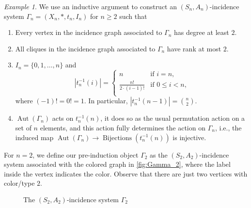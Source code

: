 \documentclass{amsart}
\theoremstyle{definition}
\theoremstyle{remark}
\newtheorem{example}[theorem]{Example}
\newcommand{\Aut}{\operatorname{Aut}}
\begin{document}
\begin{example}\label{ex:(Sn,An) incidence systems}
   We use an inductive argument to construct an $(S_n,A_n)$-incidence system $\Gamma_n=(X_n,*,t_n,I_n)$ for $n\geq 2$ such that 
    \begin{enumerate}[label={\rm (\arabic{*})}]
        \item\label{item:Ex_SnAn_1} Every vertex in the incidence graph associated to $\Gamma_n$ has degree at least $2$.
        \item\label{item:Ex_SnAn_2} All cliques in the incidence graph associated to $\Gamma_n$ have rank at most $2$.
        \item\label{item:Ex_SnAn_3} $I_n=\{0,1,\ldots,n\}$ and 
        \[
        |t_n^{-1}(i)|=
        \begin{cases}
            n & \text{if $i=n,$}\\
            \frac{n!}{2\cdot (i-1)!} & \text{if $0\leq i<n$,}\\
        \end{cases}
        \]
        where $(-1)!=0!=1$. In particular, $|t_n^{-1}(n-1)|=\binom{n}{2}$.
        \item\label{item:Ex_SnAn_4} $\Aut(\Gamma_n)$ acts on $t_n^{-1}(n)$, it does so as the usual permutation action on a set of $n$ elements, and this action fully determines the action on $\Gamma_n$, i.e., the induced map $\Aut(\Gamma_n)\to \operatorname{Bijections}(t_n^{-1}(n))$ is injective.
    \end{enumerate}   

    For $n=2$, we define our pre-induction object $\Gamma_2$ as the $(S_2,A_2)$-incidence system associated with the colored graph in \autoref{fig:Gamma_2},  where the label inside the vertex indicates the color. Observe that there are just two vertices with color/type $2$.
    
\begin{figure}[ht]
    \centering
\caption{The $(S_2,A_2)$-incidence system $\Gamma_2$}\label{fig:Gamma_2}
\end{figure}




\end{example}
\end{document}
